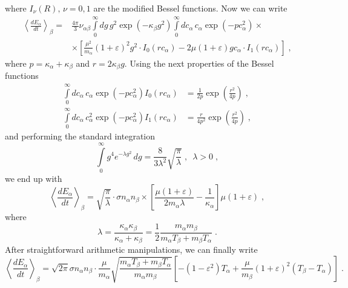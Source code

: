 \documentclass[preprint, aps, pra]{revtex4-1}
\newcommand{\ab}{{\alpha\beta}}
\newcommand{\eps}{\varepsilon}
\newcommand{\kp}{\kappa}
\begin{document}
where $I_\nu(R),\,\nu=0,1$ are the modified Bessel functions. Now we can write
\begin{equation}
  \begin{split}
    \left\langle\frac{dE_\alpha}{dt}\right\rangle_\beta = &\frac{4\pi}{3}\nu_\ab\int\limits_{0}^{\infty}dg\,g^2\exp(-\kp_\beta g^2)
    \int\limits_{0}^{\infty}dc_\alpha\,c_\alpha\exp(-pc_\alpha^2)\times\\
    &\times\left[\frac{\mu^2}{m_\alpha}(1+\eps)^2g^2\cdot I_0(rc_\alpha)-
    2\mu(1+\eps)gc_\alpha\cdot I_1(rc_\alpha)\right]\;,
  \end{split}
\end{equation}
where $p=\kp_\alpha+\kp_\beta$ and $r=2\kp_\beta g$. Using the next properties of the Bessel functions 
\begin{equation}
  \begin{split}
    \int\limits_{0}^{\infty}dc_\alpha\,c_\alpha\exp(-pc_\alpha^2)I_0(rc_\alpha)&=\frac{1}{2p}\exp\left(\frac{r^2}{4p}\right)\;,\\
    \int\limits_{0}^{\infty}dc_\alpha\,c_\alpha^2\exp(-pc_\alpha^2)I_1(rc_\alpha)&=\frac{r}{4p^2}\exp\left(\frac{r^2}{4p}\right)\;,
  \end{split}
\end{equation}
and performing the standard integration
\begin{equation}
  \int\limits_{0}^{\infty}g^4e^{-\lambda g^2}\,dg =\frac{8}{3\lambda^2}\sqrt{\frac{\pi}{\lambda}}\;,\,\,\,\lambda>0\;,
\end{equation}
we end up with 
\begin{equation}
  \left\langle\frac{dE_\alpha}{dt}\right\rangle_\beta = \sqrt{\frac{\pi}{\lambda}}\cdot\sigma n_\alpha n_\beta\times
  \left[\frac{\mu(1+\eps)}{2m_\alpha\lambda}-\frac{1}{\kp_\alpha}\right]\mu(1+\eps)\;,
\end{equation}
where
\begin{equation}
  \lambda = \frac{\kp_\alpha\kp_\beta}{\kp_\alpha+\kp_\beta}=\frac{1}{2}\frac{m_\alpha m_\beta}{m_\alpha T_\beta+m_\beta T_\alpha}\;.
\end{equation}
After straightforward arithmetic manipulations, we can finally write
\begin{equation}
  \left\langle\frac{dE_\alpha}{dt}\right\rangle_\beta = \sqrt{2\pi}\sigma n_\alpha n_\beta\cdot\frac{\mu}{m_\alpha}
  \sqrt{\frac{m_\alpha T_\beta+m_\beta T_\alpha}{m_\alpha m_\beta}}\left[-(1-\eps^2)T_\alpha + \frac{\mu}{m_\beta}(1+\eps)^2
  (T_\beta-T_\alpha)\right]\;.
\end{equation}
\end{document}
